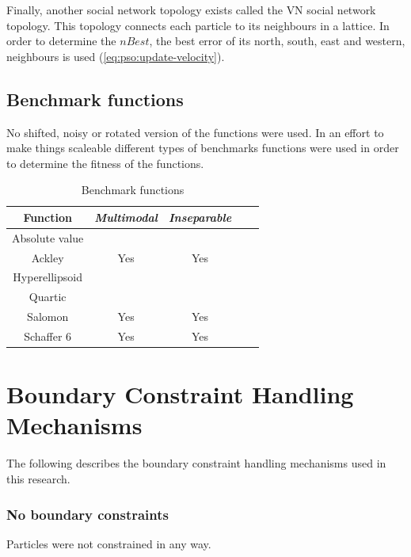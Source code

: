 \documentclass[conference]{IEEEtran}
\begin{document}
    Finally, another social network topology exists called the \ac{VN} social network topology. This topology connects each particle to its neighbours in a lattice\cite{vanwyk:overfitting-psoffnn}. In order to determine the $ nBest $, the best error of its north, south, east and western, neighbours is used (\ref{eq:pso:update-velocity}).

	\subsection{Benchmark functions}
	
	No shifted, noisy or rotated version of the functions were used. 
	In an effort to make things scaleable different types of benchmarks functions were used in order to determine the fitness of the functions.
	
	\begin{table}[htbp]
    \caption{Benchmark functions}
    \begin{center}
    \begin{tabular}{|c|c|c|c|c|}
    \hline
    \textbf{Function}& \textbf{\textit{Multimodal}}& \textbf{\textit{Inseparable}}\\
    \hline
    Absolute value& & \\
    \hline
    Ackley& Yes& Yes\\
    \hline
    Hyperellipsoid& & \\
    \hline
    Quartic& & \\
    \hline
    Salomon& Yes& Yes\\
    \hline
    Schaffer 6& Yes& Yes\\
    \hline
    \end{tabular}
    \label{tab:nn:configuration}
    \end{center}
    \end{table}

\section{Boundary Constraint Handling Mechanisms}

The following describes the boundary constraint handling mechanisms used in this research.

\subsubsection{\textbf{No boundary constraints}}
Particles were not constrained in any way.
\end{document}
